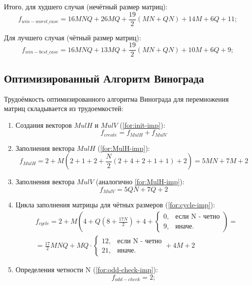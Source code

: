 Итого, для худшего случая (нечётный размер матриц): 
\begin{equation}
	\label{for:worst}
	f_{win-worst\_case} = 16MNQ+26MQ+\frac{19}{2}(MN+QN)+14M+6Q+11;
\end{equation}

Для лучшего случая (чётный размер матриц): 
\begin{equation}
	\label{for:best}
	f_{win-best\_case} = 16MNQ+13MQ+\frac{19}{2}(MN+QN)+10M+6Q+9;
\end{equation}

\subsection{Оптимизированный Алгоритм Винограда}

Трудоёмкость оптимизированного алгоритма Винограда для перемножения матриц складывается из трудоемкостей:

\begin{enumerate}
	\item Создания векторов $MulH$ и $MulV$ (\ref{for:init-imp}):
	\begin{equation}
	\label{for:init-imp}
	f_{create} = f_{MulH} + f_{MulV}
	\end{equation}
	
	\item Заполнения вектора $MulH$ (\ref{for:MulH-imp}):
	\begin{equation}
	\label{for:MulH-imp}
	f_{MulH}=2+M(2+1+2+\frac{N}{2}(2+4+2+1+1)+2)=5MN+7M+2
	\end{equation}
	
	\item Заполнения вектора $MulV$ (аналогично \ref{for:MulH-imp}):
	\begin{equation}
	\label{for:MulV-imp}
	f_{MulV}=5QN+7Q+2
	\end{equation}
	
	\item Цикла заполнения матрицы для чётных размеров (\ref{for:cycle-imp}):
	\begin{equation}
	\label{for:cycle-imp}
	\begin{split}
		&f_{cycle}=2+M(4+Q(8+\frac{17N}{2})+4+
		\begin{cases}
			0, & \text{если N - четно}\\
			9, & \text{иначе.}
		\end{cases})=\\
		&=\frac{17}{2}MNQ+MQ\cdot
		\begin{cases}
			12, & \text{если N - четно}\\
			21, & \text{иначе.}
		\end{cases}+4M+2
	\end{split}
	\end{equation}

	\item Определения четности N (\ref{for:odd-check-imp}):
	\begin{equation}
	\label{for:odd-check-imp}
	f_{odd-check} = 2;
	\end{equation}
\end{enumerate}

